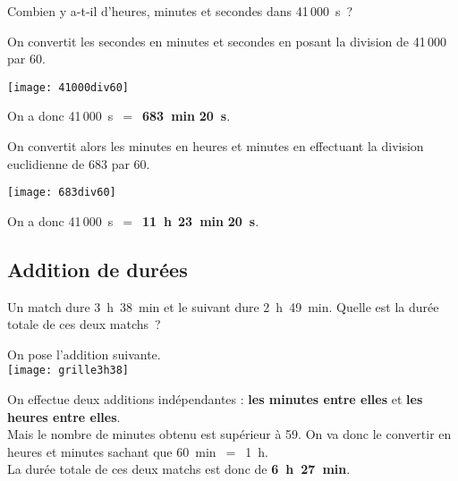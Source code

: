 \begin{exemple*1}
Combien y a-t-il d'heures, minutes et secondes dans 41\,000 s ? \\[1em]



\begin{minipage}[t]{.46\textwidth}
On convertit les secondes en minutes et secondes en posant la division de 41\,000 par 60.

\begin{center}\texttt{[image: 41000div60]}

On a donc 41\,000 s $=$ \textcolor{rose}{\textbf{683 min}} \textcolor{vert}{\textbf{20 s}}.\end{center}
\end{minipage}\hfill%
\begin{minipage}[t]{.46\textwidth}
On convertit alors les minutes en heures et minutes en effectuant la division euclidienne de 683 par 60.

\begin{center}\texttt{[image: 683div60]}

On a donc 41\,000 s $=$ \textcolor{bleu}{\textbf{11 h}} \textcolor{rose}{\textbf{23 min}} \textcolor{vert}{\textbf{20 s}}.\end{center}
\end{minipage}



\end{exemple*1}

\subsection{Addition de durées}

\begin{exemple*1}
Un match dure 3 h 38 min et le suivant dure 2 h 49 min. Quelle est la durée totale de ces deux matchs ? \\[1em]



\begin{minipage}[t]{.34\textwidth}
On pose l'addition suivante.\\[0.2em]

\texttt{[image: grille3h38]}
\end{minipage}\hfill%
\begin{minipage}[t]{.60\textwidth}
On effectue deux additions indépendantes : 
\textcolor{vert}{\textbf{les minutes entre elles}} et \textcolor{bleu}{\textbf{les heures entre elles}}.\\[0.75em]
Mais le nombre de minutes obtenu est supérieur à 59. 
On va donc le convertir en heures et minutes sachant que 60 min $=$ 1 h. \\[0.75em]
La durée totale de ces deux matchs est donc de \textcolor{rose}{\textbf{6 h 27 min}}.
\end{minipage}

\end{exemple*1}

